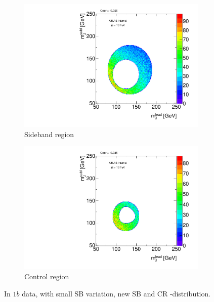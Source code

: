 \begin{figure}[htbp!]
\centering
\captionsetup{justification=centering}
    \begin{subfigure}[b]{0.45\textwidth}
        \includegraphics[width=\textwidth,angle=-90]{figures/boosted/Syst_CRSB/SB_Small_Sideband_OneTag_mH0H1.pdf}
        \caption{Sideband region}
        \label{CRSB:SB_Small_SB}
    \end{subfigure}
    \quad
    \begin{subfigure}[b]{0.45\textwidth}
        \includegraphics[width=\textwidth,angle=-90]{figures/boosted/Syst_CRSB/SB_Small_Control_OneTag_mH0H1.pdf}
        \caption{Control region}
        \label{CRSB:SB_Small_CR}
    \end{subfigure}
\caption{In $1b$ data, with small SB variation, new SB and CR \mleadJ-\msublJ distribution.}
\label{CRSB:SB_Small}
\end{figure}

